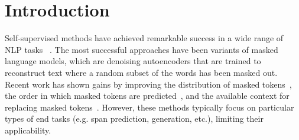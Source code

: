 \documentclass{article} %
\newcommand{\todo}[1]{{\color{red} #1}}
\begin{document}
\begin{abstract}
\end{abstract}

\section{Introduction}
Self-supervised methods have achieved remarkable success in a wide range of NLP tasks~ \cite{word2vec,elmo,bert,spanbert,xlnet,roberta}. 
The most successful approaches have been variants of masked language models, which are denoising autoencoders that are trained to reconstruct text where a random subset of the words has been masked out. Recent work has shown gains by improving the distribution of masked tokens~\cite{spanbert}, the order in which masked tokens are predicted~\cite{xlnet}, and the available context for replacing masked tokens~\cite{unilm}. However, these methods typically focus on particular types of end tasks (e.g. span prediction, generation, etc.), limiting their applicability. 
\end{document}
